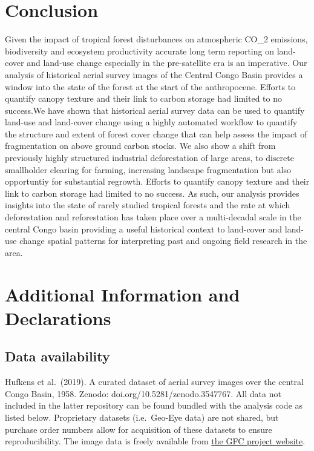 \documentclass[remote sensing,article,submit,moreauthors,pdftex,10pt,a4paper]{mdpi}
\begin{document}
\hypertarget{conclusion}{%
\section{Conclusion}\label{conclusion}}

Given the impact of tropical forest disturbances on atmospheric CO\_2
emissions, biodiversity and ecosystem productivity accurate long term
reporting on land-cover and land-use change especially in the
pre-satellite era is an imperative. Our analysis of historical aerial
survey images of the Central Congo Basin provides a window into the
state of the forest at the start of the anthropocene. Efforts to
quantify canopy texture and their link to carbon storage had limited to
no success.We have shown that historical aerial survey data can be used
to quantify land-use and land-cover change using a highly automated
workflow to quantify the structure and extent of forest cover change
that can help assess the impact of fragmentation on above ground carbon
stocks. We also show a shift from previously highly structured
industrial deforestation of large areas, to discrete smallholder
clearing for farming, increasing landscape fragmentation but also
opportuntiy for substantial regrowth. Efforts to quantify canopy texture
and their link to carbon storage had limited to no success. As such, our
analysis provides insights into the state of rarely studied tropical
forests and the rate at which deforestation and reforestation has taken
place over a multi-decadal scale in the central Congo basin providing a
useful historical context to land-cover and land-use change spatial
patterns for interpreting past and ongoing field research in the area.

\hypertarget{additional-information-and-declarations}{%
\section{Additional Information and
Declarations}\label{additional-information-and-declarations}}

\hypertarget{data-availability}{%
\subsection{Data availability}\label{data-availability}}

Hufkens et al.~(2019). A curated dataset of aerial survey images over
the central Congo Basin, 1958. Zenodo: doi.org/10.5281/zenodo.3547767.
All data not included in the latter repository can be found bundled with
the analysis code as listed below. Proprietary datasets (i.e.~Geo-Eye
data) are not shared, but purchase order numbers allow for acquisition
of these datasets to ensure reproducibility. The \citet{hansen2013}
image data is freely available from
\href{https://earthenginepartners.appspot.com/science-2013-global-forest/download_v1.6.html}{the
GFC project website}.
\end{document}
